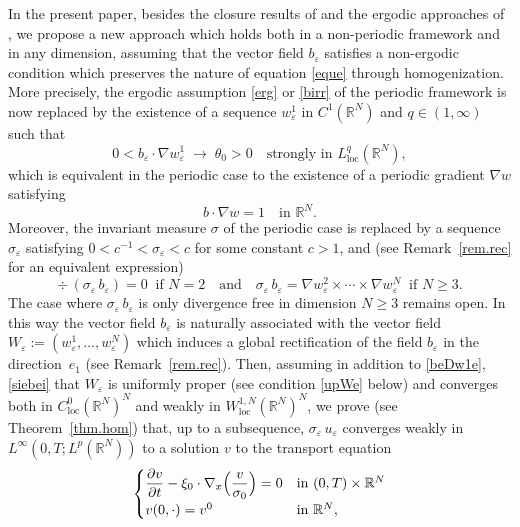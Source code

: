 \documentclass[JEP,XML,SOM,Unicode]{cedram}
\newcommand{\loc}{\mathrm{loc}}
\def \RR {\mathbb R}
\theoremstyle{plain}
\theoremstyle{definition}
\begin{document}
In the present paper, besides the closure results of \cite{AHZ1,AHZ2,AHZ3} and the ergodic approaches of \cite{Bre,HoXi,Gol1,Gol2,Tas}, we propose a new approach which holds both in a non-periodic framework and in any dimension, assuming that the vector field $b_\varepsilon$ satisfies a non-ergodic condition which preserves the nature of equation \eqref{eque} through homogenization.
More precisely, the ergodic assumption \eqref{erg} or \eqref{birr} of the periodic framework
is now replaced by the existence of a sequence $w_\varepsilon^1$ in $C^1(\RR^N)$ and $q\in(1,\infty)$ such that
\begin{equation}\label{beDw1e}
0< b_\varepsilon\cdot\nabla w_\varepsilon^1\;\to\;\theta_0>0\quad\mbox{strongly in }L^q_\loc(\RR^N),
\end{equation}
which is equivalent in the periodic case to the existence of a periodic gradient $\nabla w$ satisfying
\begin{equation}\label{bDw1}
b\cdot\nabla w=1\quad\mbox{in }\RR^N.
\end{equation}
Moreover, the invariant measure $\sigma$ of the periodic case is replaced by a sequence $\sigma_\varepsilon$ satisfying $0<c^{-1}<\sigma_\varepsilon<c$ for some constant $c>1$, and (see Remark~\ref{rem.rec} for an equivalent expression)
\begin{equation}\label{siebei}
\div\,(\sigma_\varepsilon\,b_\varepsilon)=0\;\;\mbox{if }N=2\quad\mbox{and}\quad \sigma_\varepsilon\,b_\varepsilon=\nabla w_\varepsilon^2\times\cdots\times \nabla w_\varepsilon^N\;\;\mbox{if }N\geq 3.
\end{equation}
The case where $\sigma_\varepsilon\,b_\varepsilon$ is only divergence free in dimension $N\geq 3$ remains open.
In this way the vector field $b_\varepsilon$ is naturally associated with the vector field $W_\varepsilon:=(w_\varepsilon^1,\dots, w_\varepsilon^N)$ which induces a global rectification of the field $b_\varepsilon$ in the direction~$e_1$ (see Remark~\ref{rem.rec}). Then, assuming in addition to \eqref{beDw1e}, \eqref{siebei} that $W_\varepsilon$ is uniformly proper (see condition \eqref{upWe} below) and converges both in $C^0_\loc(\RR^N)^N$ and weakly in $W^{1,N}_\loc(\RR^N)^N$, we prove (see Theorem~\ref{thm.hom}) that, up to a subsequence, $\sigma_\varepsilon\,u_\varepsilon$ converges weakly in $L^\infty(0,T;L^p(\RR^N))$ to a solution $v$ to the transport equation
\begin{equation}\label{eqvi}
\begin{cases}
\dfrac{\partial v}{\partial t}-\xi_0\cdot\nabla_x\Bigl(\dfrac{v}{\sigma_0}\Bigr)=0 & \mbox{in }(0,T)\times\RR^N
\\[5pt]
v(0,\cdot)=v^0 & \mbox{in }\RR^N,
\end{cases}
\end{equation}
\end{document}
